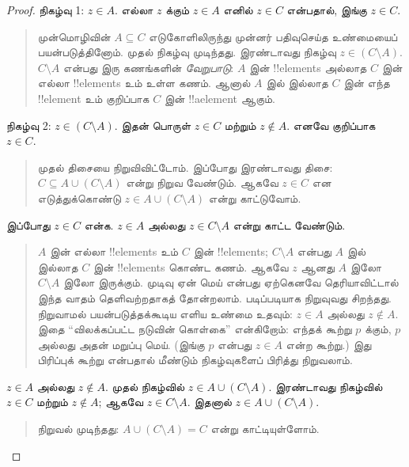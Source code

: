 \documentclass[../../../include/open-logic-section]{subfiles}
\begin{document}
\begin{proof}
  நிகழ்வு 1: $z \in A$. எல்லா $z$ க்கும்
  $z \in A$ எனில் $z \in C$ என்பதால், இங்கு
  $z \in C$.
  \begin{quote}
    முன்மொழிவின் $A \subseteq C$ எடுகோளிலிருந்து
    முன்னர் பதிவுசெய்த உண்மையைப் பயன்படுத்தினோம்.
    முதல் நிகழ்வு முடிந்தது. இரண்டாவது நிகழ்வு
    $z \in (C \setminus A)$. $C \setminus A$
    என்பது இரு கணங்களின் \emph{வேறுபாடு}:
    $A$ இன் !!{element}s அல்லாத $C$ இன்
    எல்லா !!{element}s உம் உள்ள கணம். ஆனால்
    $A$ இல் இல்லாத $C$ இன் எந்த !!{element}
    உம் குறிப்பாக $C$ இன் !!a{element} ஆகும்.
  \end{quote}
  நிகழ்வு 2: $z \in (C \setminus A)$.
  இதன் பொருள் $z \in C$ மற்றும் $z \notin A$.
  எனவே குறிப்பாக $z \in C$.
  \begin{quote}
    முதல் திசையை நிறுவிவிட்டோம். இப்போது இரண்டாவது
    திசை: $C \subseteq A \cup (C \setminus A)$
    என்று நிறுவ வேண்டும். ஆகவே $z \in C$
    என எடுத்துக்கொண்டு $z \in A \cup (C \setminus A)$
    என்று காட்டுவோம்.
  \end{quote}

  இப்போது $z \in C$ என்க. $z \in A$ அல்லது
  $z \in C \setminus A$ என்று காட்ட வேண்டும்.
  \begin{quote}
    $A$ இன் எல்லா !!{element}s உம் $C$ இன்
    !!{element}s; $C \setminus A$ என்பது
    $A$ இல் இல்லாத $C$ இன் !!{element}s கொண்ட கணம்.
    ஆகவே $z$ ஆனது $A$ இலோ $C \setminus A$
    இலோ இருக்கும். முடிவு ஏன் மெய் என்பது ஏற்கெனவே
    தெரியாவிட்டால் இந்த வாதம் தெளிவற்றதாகத் தோன்றலாம்.
    படிப்படியாக நிறுவுவது சிறந்தது. நிறுவாமல் பயன்படுத்தக்கூடிய
    எளிய உண்மை உதவும்: $z \in A$ அல்லது $z \notin A$.
    இதை ``விலக்கப்பட்ட நடுவின் கொள்கை'' என்கிறோம்:
    எந்தக் கூற்று $p$ க்கும், $p$ அல்லது அதன் மறுப்பு
    மெய். (இங்கு $p$ என்பது $z \in A$ என்ற கூற்று.)
    இது பிரிப்புக் கூற்று என்பதால் மீண்டும் நிகழ்வுகளைப்
    பிரித்து நிறுவலாம்.
  \end{quote}

  $z \in A$ அல்லது $z \notin A$. முதல் நிகழ்வில்
  $z \in A \cup (C \setminus A)$. இரண்டாவது நிகழ்வில்
  $z \in C$ மற்றும் $z \notin A$; ஆகவே
  $z \in C \setminus A$. இதனால்
  $z \in A \cup (C \setminus A)$.
  \begin{quote}
    நிறுவல் முடிந்தது: $A \cup (C \setminus A) = C$
    என்று காட்டியுள்ளோம்.
  \end{quote}
\end{proof}
\end{document}
